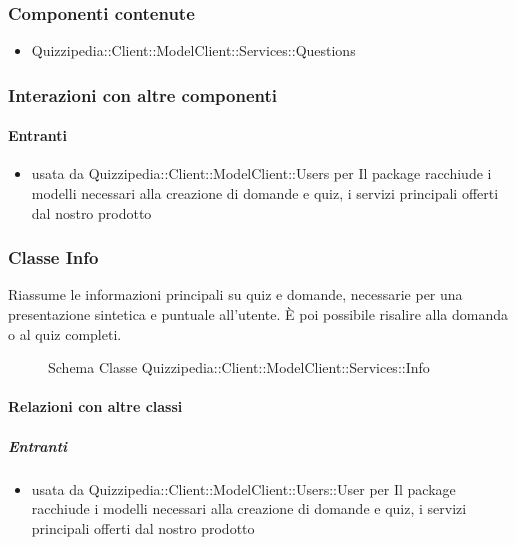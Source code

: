 \subsubsection{Componenti contenute}
\begin{itemize}
\item Quizzipedia::Client::ModelClient::Services::Questions
\end{itemize}
\subsubsection{Interazioni con altre componenti}
\paragraph{Entranti}
\begin{itemize}
\item usata da Quizzipedia::Client::ModelClient::Users per Il package racchiude i modelli necessari alla creazione di domande e quiz, i servizi principali offerti dal nostro prodotto
\end{itemize}
\subsubsection{Classe Info}
Riassume le informazioni principali su quiz e domande, necessarie per una presentazione sintetica e puntuale all'utente. È poi possibile risalire alla domanda o al quiz completi.
\begin{figure}[H]
\centering
\noindent{}
\caption[Schema Classe Info]{Schema Classe Quizzipedia::Client::ModelClient::Services::Info}
\end{figure}
\paragraph{Relazioni con altre classi}
\subparagraph{Entranti}
\begin{itemize}
\item usata da Quizzipedia::Client::ModelClient::Users::User per Il package racchiude i modelli necessari alla creazione di domande e quiz, i servizi principali offerti dal nostro prodotto
\end{itemize}
